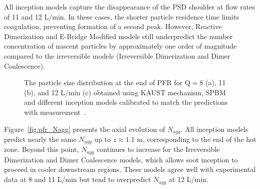 All inception models capture the disappearance of the PSD shoulder at flow rates of 11 and 12 L/min. In these cases, the shorter particle residence time limits coagulation, preventing formation of a second peak. However, Reactive Dimerization and E-Bridge Modified models still underpredict the number concentration of nascent particles by approximately one order of magnitude compared to the irreversible models (Irreversible Dimerization and Dimer Coalescence).




\begin{figure}[H]
	\centering
	\caption{The particle size distribution at the end of PFR for $\mathrm{Q}=8$ (a), 11 (b), and 12 L/min (c) obtained using KAUST mechanism, SPBM and different inception models calibrated to match the predictions with measurement~\citep{mei2019quantitative}.}
	\label{fig:pfr_psd} 
\end{figure}

Figure~\ref{fig:pfr_Nagg} presents the axial evolution of $N_{agg}$. All inception models predict nearly the same $N_{agg}$ up to $z \approx 1.1$ m, corresponding to the end of the hot zone. Beyond this point, $N_{agg}$ continues to increase for the Irreversible Dimerization and Dimer Coalescence models, which allows soot inception to proceed in cooler downstream regions. These models agree well with experimental data at 8 and 11 L/min but tend to overpredict $N_{agg}$ at 12 L/min.

